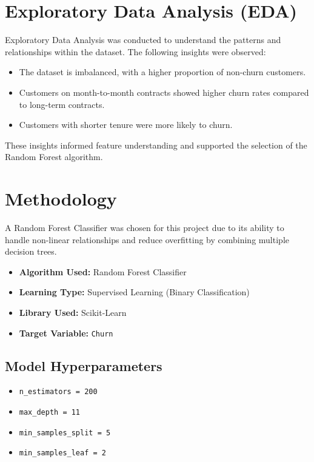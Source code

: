\documentclass[12pt]{article}
\begin{document}
\section{Exploratory Data Analysis (EDA)}

Exploratory Data Analysis was conducted to understand the patterns and relationships within the dataset. The following insights were observed:

\begin{itemize}
    \item The dataset is imbalanced, with a higher proportion of non-churn customers.
    \item Customers on month-to-month contracts showed higher churn rates compared to long-term contracts.
    \item Customers with shorter tenure were more likely to churn.
\end{itemize}

These insights informed feature understanding and supported the selection of the Random Forest algorithm.

\section{Methodology}

A Random Forest Classifier was chosen for this project due to its ability to handle non-linear relationships and reduce overfitting by combining multiple decision trees.

\begin{itemize}
    \item \textbf{Algorithm Used:} Random Forest Classifier
    \item \textbf{Learning Type:} Supervised Learning (Binary Classification)
    \item \textbf{Library Used:} Scikit-Learn
    \item \textbf{Target Variable:} \texttt{Churn}
\end{itemize}

\subsection*{Model Hyperparameters}

\begin{itemize}
    \item \texttt{n\_estimators = 200}
    \item \texttt{max\_depth = 11}
    \item \texttt{min\_samples\_split = 5}
    \item \texttt{min\_samples\_leaf = 2}
\end{itemize}
\end{document}

